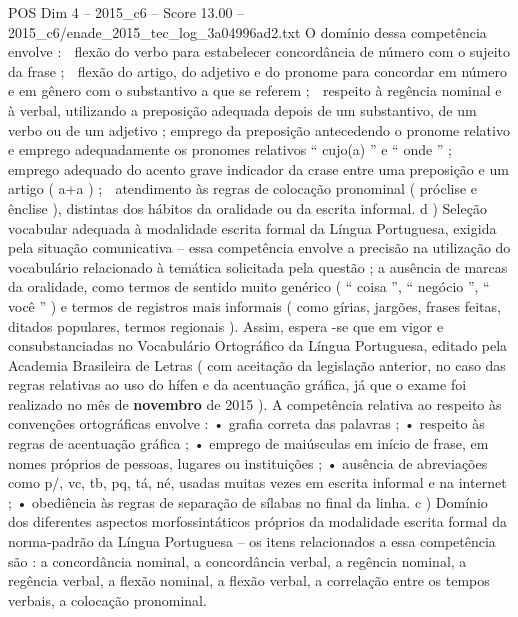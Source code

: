 \begin{textsample}{POS Dim 4 – 2015\_c6 – Score 13.00 – 2015\_c6/enade\_2015\_tec\_log\_3a04996ad2.txt}
O domínio dessa competência envolve :  flexão do verbo para estabelecer concordância de número com o sujeito da frase ;  flexão do artigo, do adjetivo e do pronome para concordar em número e em gênero com o substantivo a que se referem ;  respeito à regência nominal e à verbal, utilizando a preposição adequada depois de um substantivo, de um verbo ou de um adjetivo ; emprego da preposição antecedendo o pronome relativo e emprego adequadamente os pronomes relativos “ cujo(a) ” e “ onde ” ;  emprego adequado do acento grave indicador da crase entre uma preposição e um artigo ( a+a ) ;  atendimento às regras de colocação pronominal ( próclise e ênclise ), distintas dos hábitos da oralidade ou da escrita informal. d ) Seleção vocabular adequada à modalidade escrita formal da Língua Portuguesa, exigida pela situação comunicativa – essa competência envolve a precisão na utilização do vocabulário relacionado à temática solicitada pela questão ; a ausência de marcas da oralidade, como termos de sentido muito genérico ( “ coisa ”, “ negócio ”, “ você ” ) e termos de registros mais informais ( como gírias, jargões, frases feitas, ditados populares, termos regionais ).
Assim, espera -se que em vigor e consubstanciadas no Vocabulário Ortográfico da Língua Portuguesa, editado pela Academia Brasileira de Letras ( com aceitação da legislação anterior, no caso das regras relativas ao uso do hífen e da acentuação gráfica, já que o exame foi realizado no mês de \textbf{novembro} de 2015 ).
A competência relativa ao respeito às convenções ortográficas envolve : • grafia correta das palavras ; • respeito às regras de acentuação gráfica ; • emprego de maiúsculas em início de frase, em nomes próprios de pessoas, lugares ou instituições ; • ausência de abreviações como p/, vc, tb, pq, tá, né, usadas muitas vezes em escrita informal e na internet ; • obediência às regras de separação de sílabas no final da linha. c ) Domínio dos diferentes aspectos morfossintáticos próprios da modalidade escrita formal da norma-padrão da Língua Portuguesa – os itens relacionados a essa competência são : a concordância nominal, a concordância verbal, a regência nominal, a regência verbal, a flexão nominal, a flexão verbal, a correlação entre os tempos verbais, a colocação pronominal.

\end{textsample}
